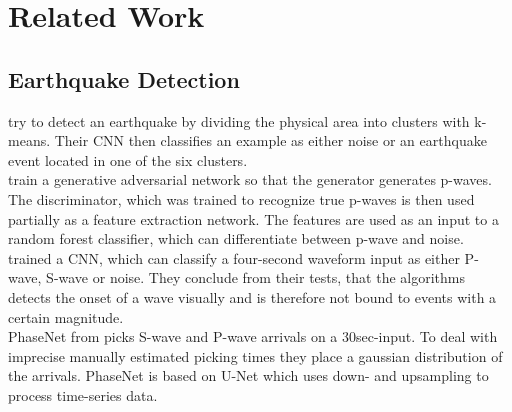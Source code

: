 \documentclass[thesis.tex]{subfiles}
\begin{document}
%
\chapter{Related Work}\label{chap:prevwork}

%
%

\section{Earthquake Detection}
\cite{perol2018convolutional} try to detect an earthquake by dividing the physical area into clusters with k-means. Their CNN then classifies an example as either noise or an earthquake event located in one of the six clusters.\\
\cite{li2018machine} train a generative adversarial network so that the generator generates p-waves. The discriminator, which was trained to recognize true p-waves is then used partially as a feature extraction network. The features are used as an input to a random forest classifier, which can differentiate between p-wave and noise.\\
\cite{ross2018generalized} trained a CNN, which can classify a four-second waveform input as either P-wave, S-wave or noise. They conclude from their tests, that the algorithms detects the onset of a wave visually and is therefore not bound to events with a certain magnitude.\\
PhaseNet from \cite{zhu2019phasenet} picks S-wave and P-wave arrivals on a 30sec-input. To deal with imprecise manually estimated picking times they place a gaussian distribution of the arrivals. PhaseNet is based on U-Net  which uses down- and upsampling to process time-series data.
%
%
\end{document}
